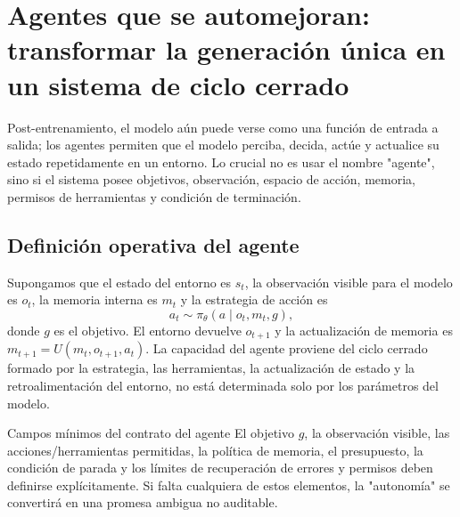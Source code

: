 \section{Agentes que se automejoran: transformar la generación única en un sistema de ciclo cerrado}

Post-entrenamiento, el modelo aún puede verse como una función de entrada a salida; los agentes permiten que el modelo perciba, decida, actúe y actualice su estado repetidamente en un entorno. Lo crucial no es usar el nombre "agente", sino si el sistema posee objetivos, observación, espacio de acción, memoria, permisos de herramientas y condición de terminación.

\subsection{Definición operativa del agente}

Supongamos que el estado del entorno es $s_t$, la observación visible para el modelo es $o_t$, la memoria interna es $m_t$ y la estrategia de acción es
\[
a_t\sim\pi_{\theta}(a\mid o_t,m_t,g),
\]
donde $g$ es el objetivo. El entorno devuelve $o_{t+1}$ y la actualización de memoria es $m_{t+1}=U(m_t,o_{t+1},a_t)$. La capacidad del agente proviene del ciclo cerrado formado por la estrategia, las herramientas, la actualización de estado y la retroalimentación del entorno, no está determinada solo por los parámetros del modelo.




\begin{importantbox}{Campos mínimos del contrato del agente}
El objetivo $g$, la observación visible, las acciones/herramientas permitidas, la política de memoria, el presupuesto, la condición de parada y los límites de recuperación de errores y permisos deben definirse explícitamente. Si falta cualquiera de estos elementos, la "autonomía" se convertirá en una promesa ambigua no auditable.
\end{importantbox}

